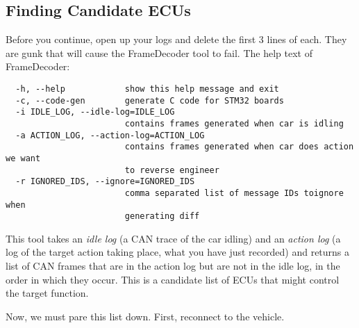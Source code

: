 \documentclass[12pt]{article}
\begin{document}
\subsection{Finding Candidate ECUs}
Before you continue, open up your logs and delete the first 3 lines of each.
They are gunk that will cause the FrameDecoder tool to fail. The help text of
FrameDecoder:
\begin{verbatim}
  -h, --help            show this help message and exit
  -c, --code-gen        generate C code for STM32 boards
  -i IDLE_LOG, --idle-log=IDLE_LOG
                        contains frames generated when car is idling
  -a ACTION_LOG, --action-log=ACTION_LOG
                        contains frames generated when car does action we want
                        to reverse engineer
  -r IGNORED_IDS, --ignore=IGNORED_IDS
                        comma separated list of message IDs toignore when
                        generating diff
\end{verbatim}
This tool takes an \textit{idle log} (a CAN trace of the car idling) and an
\textit{action log} (a log of the target action taking place, what you have
just recorded) and returns a list of CAN frames that are in the action log but
are not in the idle log, in the order in which they occur. This is a candidate
list of ECUs that might control the target function. 

Now, we must pare this list down. First, reconnect to the vehicle. 
\end{document}
